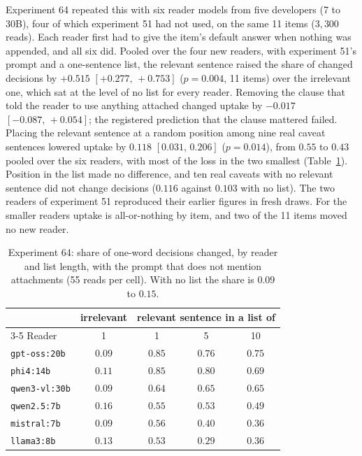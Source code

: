 \documentclass[10pt,twocolumn]{article}
\newcommand{\ci}[2]{\ensuremath{[#1,\,#2]}}
\begin{document}
Experiment 64 repeated this with six reader models from five
developers (7 to 30B), four of which experiment 51 had not used, on the
same 11 items ($3{,}300$ reads). Each reader first had to give the
item's default answer when nothing was appended, and all six did.
Pooled over the four new readers, with experiment 51's prompt and a
one-sentence list, the relevant sentence raised the share of changed
decisions by $+0.515$ \ci{+0.277}{+0.753} ($p=0.004$, 11 items) over
the irrelevant one, which sat at the level of no list for every reader.
Removing the clause that told the reader to use anything attached
changed uptake by $-0.017$ \ci{-0.087}{+0.054}; the registered
prediction that the clause mattered failed. Placing the relevant
sentence at a random position among nine real caveat sentences lowered
uptake by $0.118$ \ci{0.031}{0.206} ($p=0.014$), from $0.55$ to $0.43$
pooled over the six readers, with most of the loss in the two smallest
(Table~\ref{tab:readers}). Position in the list made no difference, and
ten real caveats with no relevant sentence did not change decisions
($0.116$ against $0.103$ with no list). The two readers of experiment
51 reproduced their earlier figures in fresh draws. For the smaller
readers uptake is all-or-nothing by item, and two of the 11 items moved
no new reader.

\begin{table}[t]
\centering\footnotesize
\setlength{\tabcolsep}{4pt}
\begin{tabular}{lcccc}
\toprule
 & irrelevant & \multicolumn{3}{c}{relevant sentence in a list of} \\
\cmidrule(lr){3-5}
Reader & 1 & 1 & 5 & 10 \\
\midrule
\texttt{gpt-oss:20b} & $0.09$ & $0.85$ & $0.76$ & $0.75$ \\
\texttt{phi4:14b} & $0.11$ & $0.85$ & $0.80$ & $0.69$ \\
\texttt{qwen3-vl:30b} & $0.09$ & $0.64$ & $0.65$ & $0.65$ \\
\texttt{qwen2.5:7b} & $0.16$ & $0.55$ & $0.53$ & $0.49$ \\
\texttt{mistral:7b} & $0.09$ & $0.56$ & $0.40$ & $0.36$ \\
\texttt{llama3:8b} & $0.13$ & $0.53$ & $0.29$ & $0.36$ \\
\bottomrule
\end{tabular}
\caption{Experiment 64: share of one-word decisions changed, by reader
and list length, with the prompt that does not mention attachments (55
reads per cell). With no list the share is $0.09$ to $0.15$.}
\label{tab:readers}
\end{table}
\end{document}
